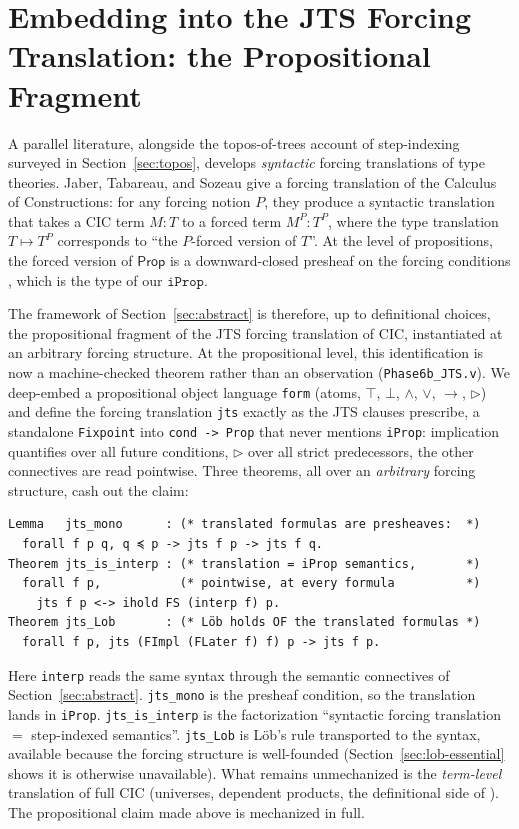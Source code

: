 \section{Embedding into the JTS Forcing Translation: the Propositional Fragment}
\label{sec:bridge}

A parallel literature, alongside the topos-of-trees account of
step-indexing surveyed in Section~\ref{sec:topos}, develops
\emph{syntactic} forcing translations of type theories.  Jaber,
Tabareau, and Sozeau \citeyearpar{jaber-tabareau-sozeau-2012} give a forcing
translation of the Calculus of Constructions: for any forcing notion
$P$, they produce a syntactic translation that takes a CIC term
$M : T$ to a forced term $M^P : T^P$, where the type translation
$T \mapsto T^P$ corresponds to ``the $P$-forced version of $T$''.  At
the level of propositions, the forced version of $\mathsf{Prop}$ is
a downward-closed presheaf on the forcing conditions
\cite{jaber-et-al-2016}, which is the type of our $\mathtt{iProp}$.

The framework of Section~\ref{sec:abstract} is therefore, up to
definitional choices, the propositional fragment of the JTS forcing
translation of CIC, instantiated at an arbitrary forcing structure.
At the propositional level, this identification is now a
machine-checked theorem rather than an observation
(\texttt{Phase6b\_JTS.v}).  We deep-embed a propositional object
language \texttt{form} (atoms, $\top$, $\bot$, $\wedge$, $\vee$,
$\to$, $\triangleright$) and define the forcing translation
\texttt{jts} exactly as the JTS clauses prescribe, a standalone
\texttt{Fixpoint} into \texttt{cond -> Prop} that never mentions
\texttt{iProp}: implication quantifies over all future conditions,
$\triangleright$ over all strict predecessors, the other connectives
are read pointwise.  Three theorems, all over an \emph{arbitrary}
forcing structure, cash out the claim:

\begin{lstlisting}
Lemma   jts_mono      : (* translated formulas are presheaves:  *)
  forall f p q, q ≼ p -> jts f p -> jts f q.
Theorem jts_is_interp : (* translation = iProp semantics,       *)
  forall f p,           (* pointwise, at every formula          *)
    jts f p <-> ihold FS (interp f) p.
Theorem jts_Lob       : (* Löb holds OF the translated formulas *)
  forall f p, jts (FImpl (FLater f) f) p -> jts f p.
\end{lstlisting}

\noindent
Here \texttt{interp} reads the same syntax through the semantic
connectives of Section~\ref{sec:abstract}.  \texttt{jts\_mono} is the
presheaf condition, so the translation lands in \texttt{iProp}.
\texttt{jts\_is\_interp} is the factorization ``syntactic forcing
translation $=$ step-indexed semantics''.  \texttt{jts\_Lob} is
Löb's rule transported to the syntax, available because the forcing
structure is well-founded (Section~\ref{sec:lob-essential} shows it
is otherwise unavailable).
What remains unmechanized is the \emph{term-level} translation of
full CIC (universes, dependent products, the definitional side of
\cite{jaber-et-al-2016}).  The propositional claim made above is
mechanized in full.

